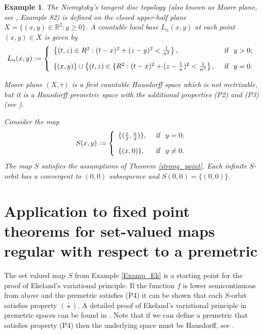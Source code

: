\documentclass{article}
\def\text#1{\,\;\hbox{#1}\;\,}
\newcommand{\R}{\mathbb{R}}
\newtheorem{examp}[theo]{Example}
\begin{document}
\begin{examp} \label{Moore_plane}
The Niemytzky's tangent disc topology (also known as Moore plane, see \cite{Counterexamples}, Example 82) is defined on the closed upper-half plane $X=\{(x,y) \in \R^2: y \geq 0\}$. A countable local  base $L_n(x,y)$  at each point $(x,y) \in X$ is given by 
\[L_n(x,y):=\left\{ \begin{array}{ll}
\left\{(t,z) \in R^2: (t-x)^2+(z-y)^2<\frac{1}{n^2}\right\}, & \text{if} \; y>0;\\[10pt]
\{(x,y)\} \cup\left\{(t,z) \in \{R^2: (t-x)^2+(z-\frac{1}{n})^2<\frac{1}{n^2}\right\}, & \text{if} \; y=0.\\
\end{array} \right.\]


 Moore plane $(X,\tau)$ is a first countable Hausdorff space which is not metrizable, but it is a Hausdorff premetric space with the additional properties (P2) and (P3) (see \cite{IKZ}). 
 
 
\smallskip

Consider the map
\[S(x,y):=\left\{\begin{array}{ll}
\{(\frac{x}{2},\frac{x}{2})\}, & \text{if} \; y=0;\\[10pt]
\{(x,0)\}, & \text{if} \; y \neq 0.\\
\end{array} \right.\]
The map $S$ satisfies the assumptions of Theorem \ref{strong_point}. Each infinite $S$-orbit  has a convergent to $(0,0)$ subsequence and $S(0,0)= \{(0,0)\}$.
\end{examp}

\section{Application to fixed point theorems for set-valued maps regular with respect to a premetric}

The set valued map $S$ from Example \ref{Examp_Ek} is a starting point for the proof of Ekeland's variational principle. If the function $f$ is lower semicontinuous from above and the premetric satisfies (P4) it can be shown that each $S$-orbit satisfies property $(\bar{\star})$.  A detailed proof of Ekeland's variational principle in premetric spaces can be found in \cite{KZ}. Note that if we can define a premetric that satisfies property (P4) then the underlying space must be Hausdorff, see \cite{KZ}. 
\end{document}
